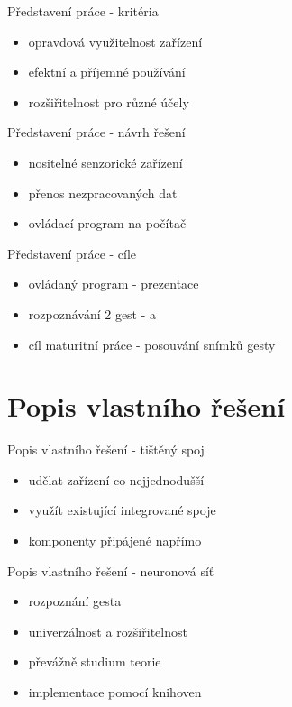 \documentclass[14pt]{beamer}
\begin{document}
\begin{frame}{Představení práce - kritéria}
	\begin{itemize}
    \item opravdová využitelnost zařízení
    \item efektní a příjemné používání
    \item rozšiřitelnost pro různé účely
  \end{itemize}
\end{frame}

\begin{frame}{Představení práce - návrh řešení}
	\begin{itemize}
    \item nositelné senzorické zařízení
    \item přenos nezpracovaných dat
    \item ovládací program na počítač
  \end{itemize}
\end{frame}

\begin{frame}{Představení práce - cíle}
  \begin{itemize}
    \item ovládaný program - prezentace
    \item rozpoznávání 2 gest -  a 
    \item cíl maturitní práce - posouvání snímků gesty
  \end{itemize}
\end{frame}


\section{Popis vlastního řešení}
\begin{frame}{Popis vlastního řešení - tištěný spoj}
	\begin{itemize}
    \item udělat zařízení co nejjednodušší
    \item využít existující integrované spoje
    \item komponenty připájené napřímo
  \end{itemize}
\end{frame}

\begin{frame}{Popis vlastního řešení - neuronová síť}
	\begin{itemize}
    \item rozpoznání gesta
    \item univerzálnost a rozšiřitelnost
    \item převážně studium teorie
    \item implementace pomocí knihoven
  \end{itemize}
\end{frame}
\end{document}
